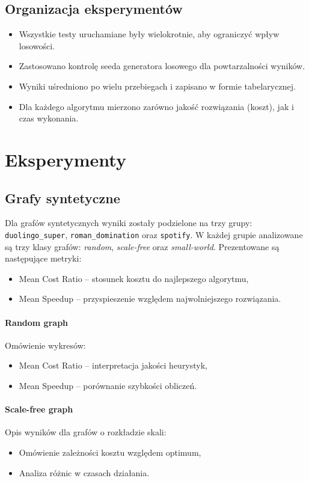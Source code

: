 \subsection{Organizacja eksperymentów}
\begin{itemize}
    \item Wszystkie testy uruchamiane były wielokrotnie, aby ograniczyć wpływ losowości.
    \item Zastosowano kontrolę seeda generatora losowego dla powtarzalności wyników.
    \item Wyniki uśredniono po wielu przebiegach i zapisano w formie tabelarycznej.
    \item Dla każdego algorytmu mierzono zarówno jakość rozwiązania (koszt), jak i czas wykonania.
\end{itemize}


\section{Eksperymenty}

\subsection{Grafy syntetyczne}

Dla grafów syntetycznych wyniki zostały podzielone na trzy grupy: \texttt{duolingo\_super}, \texttt{roman\_domination} oraz \texttt{spotify}. 
W każdej grupie analizowane są trzy klasy grafów: \textit{random}, \textit{scale-free} oraz \textit{small-world}. 
Prezentowane są następujące metryki:

\begin{itemize}
    \item Mean Cost Ratio – stosunek kosztu do najlepszego algorytmu,
    \item Mean Speedup – przyspieszenie względem najwolniejszego rozwiązania.
\end{itemize}

\paragraph{Random graph}
Omówienie wykresów:
\begin{itemize}
    \item Mean Cost Ratio – interpretacja jakości heurystyk,
    \item Mean Speedup – porównanie szybkości obliczeń.
\end{itemize}

\paragraph{Scale-free graph}
Opis wyników dla grafów o rozkładzie skali:
\begin{itemize}
    \item Omówienie zależności kosztu względem optimum,
    \item Analiza różnic w czasach działania.
\end{itemize}

